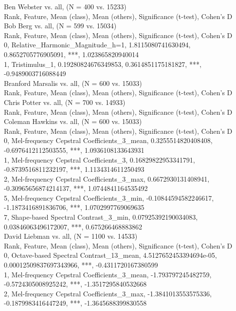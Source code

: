 Ben Webster vs. all, (N = 400 vs. 15233)\\
Rank, Feature, Mean (class), Mean (others), Significance (t-test), Cohen's D\\
Bob Berg vs. all, (N = 599 vs. 15034)\\
Rank, Feature, Mean (class), Mean (others), Significance (t-test), Cohen's D\\
0, Relative_Harmonic_Magnitude_h=1, 1.8115080741630494, 0.8652705776905091, ***, 1.023865820940014\\
1, Tristimulus_1, 0.19280824676349853, 0.3614851175181827, ***, -0.9489003716088449\\
Branford Marsalis vs. all, (N = 600 vs. 15033)\\
Rank, Feature, Mean (class), Mean (others), Significance (t-test), Cohen's D\\
Chris Potter vs. all, (N = 700 vs. 14933)\\
Rank, Feature, Mean (class), Mean (others), Significance (t-test), Cohen's D\\
Coleman Hawkins vs. all, (N = 600 vs. 15033)\\
Rank, Feature, Mean (class), Mean (others), Significance (t-test), Cohen's D\\
0, Mel-frequency Cepstral Coefficients_3_mean, 0.3255514820408408, -0.6976412112503555, ***, 1.0936108133643931\\
1, Mel-frequency Cepstral Coefficients_3, 0.16829822953341791, -0.8739516811232197, ***, 1.1134314611250493\\
2, Mel-frequency Cepstral Coefficients_3_max, 0.6672930131408941, -0.30965656874214137, ***, 1.0744841164535492\\
5, Mel-frequency Cepstral Coefficients_3_min, -0.10844594582246617, -1.1873416891836706, ***, 1.0702997769069635\\
7, Shape-based Spectral Contrast_3_min, 0.07925392190034083, 0.03846063496172007, ***, 0.675266468883862\\
David Liebman vs. all, (N = 1100 vs. 14533)\\
Rank, Feature, Mean (class), Mean (others), Significance (t-test), Cohen's D\\
0, Octave-based Spectral Contrast_13_mean, 4.5127652453394694e-05, 0.00012509837697343966, ***, -0.4311720167380599\\
1, Mel-frequency Cepstral Coefficients_3_mean, -1.793797245482759, -0.5724305008925242, ***, -1.3517295840532668\\
2, Mel-frequency Cepstral Coefficients_3_max, -1.3841013553575336, -0.1879983416447249, ***, -1.3645688399830558\\
